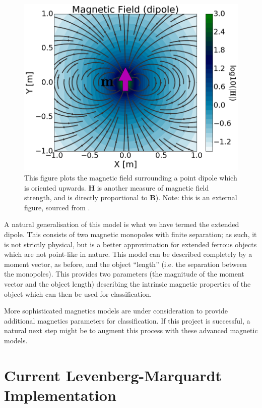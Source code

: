 \documentclass[10pt, a4paper, twocolumn]{article} %
\begin{document}
\begin{figure}
	\includegraphics[width=\linewidth]{Figures/dipole_field.png} %
	\caption{This figure plots the magnetic field surrounding a point dipole which is oriented upwards. $\mathbf{H}$ is another measure of magnetic field strength, and is directly proportional to $\mathbf{B}$). Note: this is an external figure, sourced from \parencite{DefiningDipole}.}
	\label{dipole_field}
\end{figure}


A natural generalisation of this model is what we have termed the extended dipole. This consists of two magnetic monopoles with finite separation; as such, it is not strictly physical, but is a better approximation for extended ferrous objects which are not point-like in nature. This model can be described completely by a moment vector, as before, and the object “length” (i.e. the separation between the monopoles). This provides two parameters (the magnitude of the moment vector and the object length) describing the intrinsic magnetic properties of the object which can then be used for classification.

More sophisticated magnetics models are under consideration to provide additional magnetics parameters for classification. If this project is successful, a natural next step might be to augment this process with these advanced magnetic models.

\section{Current Levenberg-Marquardt Implementation}
\end{document}
